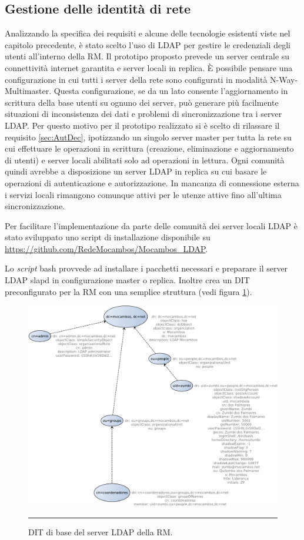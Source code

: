 \subsection{Gestione delle identità di rete}
Analizzando la specifica dei requisiti e alcune delle tecnologie
esistenti viste nel capitolo precedente, è stato scelto l'uso di LDAP
per gestire le credenziali degli utenti all'interno della RM. Il
prototipo proposto prevede un server centrale su connettività internet
garantita e server locali in replica. È possibile pensare una
configurazione in cui tutti i server della rete sono configurati in
modalità N-Way-Multimaster. Questa configurazione, se da un lato
consente l'aggiornamento in scrittura della base utenti su ognuno dei
server, può generare più facilmente situazioni di inconsistenza dei
dati e problemi di sincronizzazione tra i server LDAP. Per questo
motivo per il prototipo realizzato si è scelto di rilassare il
requisito \ref{sec:AutDec}, ipotizzando un singolo server master per
tutta la rete su cui effettuare le operazioni in scrittura (creazione,
eliminazione e aggiornamento di utenti) e server locali abilitati solo
ad operazioni in lettura. Ogni comunità quindi avrebbe a disposizione
un server LDAP in replica su cui basare le operazioni di
autenticazione e autorizzazione. In mancanza di connessione esterna i
servizi locali rimangono comunque attivi per le utenze attive fino
all'ultima sincronizzazione.

Per facilitare l'implementazione da parte delle comunità dei server
locali LDAP è stato sviluppato uno script di installazione disponibile
su \url{https://github.com/RedeMocambos/Mocambos_LDAP}.

Lo \textit{script} bash provvede ad installare i pacchetti necessari e
preparare il server LDAP slapd in configurazione master o
replica. Inoltre crea un DIT preconfigurato per la RM con una semplice
struttura (vedi figura \ref{fig:DIT_ReteMocambos}).

\begin{figure}[htbp]
  \centering
  \includegraphics[width=\textwidth]{./Figure/DIT_ReteMocambos-crop.pdf}
  \rule{35em}{0.5pt}
  \caption[DIT di base del server LDAP della RM]{DIT di base del
    server LDAP della RM.}
  \label{fig:DIT_ReteMocambos}
\end{figure}





